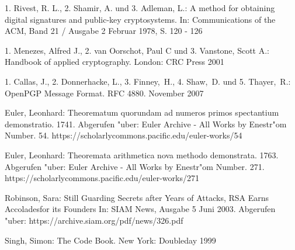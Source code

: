 \begin{thebibliography}{9}
1. Rivest, R. L., 2. Shamir, A. und 3. Adleman, L.:
A method for obtaining digital signatures and public-key cryptosystems.
In: Communications of the ACM, Band 21 / Ausgabe 2 Februar 1978, S. 120 - 126

1. Menezes, Alfred J., 2. van Oorschot, Paul C und 3. Vanstone, Scott A.:
Handbook of applied cryptography.
London: CRC Press 2001

1. Callas, J., 2. Donnerhacke, L., 3. Finney,~H., 4. Shaw,~D. und 5. Thayer,~R.:
OpenPGP Message Format. RFC 4880. November 2007

Euler, Leonhard: Theorematum quorundam ad numeros primos spectantium demonstratio.
1741. Abgerufen "uber: Euler Archive - All Works by Enestr"om Number. 54.
https://scholarlycommons.pacific.edu/euler-works/54

Euler, Leonhard: Theoremata arithmetica nova methodo demonstrata.
1763. Abgerufen "uber: Euler Archive - All Works by Enestr"om Number. 271.
https://scholarlycommons.pacific.edu/euler-works/271

Robinson, Sara: Still Guarding Secrets after Years of Attacks, RSA Earns Accoladesfor its Founders
In: SIAM News, Ausgabe 5 Juni 2003.
Abgerufen "uber: https://archive.siam.org/pdf/news/326.pdf

Singh, Simon: The Code Book. New York: Doubleday 1999

\piicitations
\end{thebibliography}
